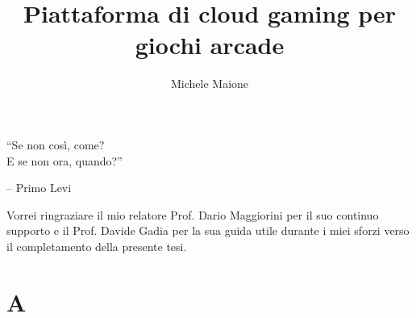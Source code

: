 \documentclass[italian]{report}
\title{Piattaforma di cloud gaming per giochi arcade}
\author{Michele Maione}
\begin{document}
\renewcommand\contentsname{Indice}
\frontespizio
\beforepreface

{
\raggedleft \large \sl 
	
	
	``Se non così, come?\\E se non ora, quando?''
	
	\bigskip
	
	\--- Primo Levi\\
}



Vorrei ringraziare il mio relatore Prof. Dario Maggiorini per il suo continuo supporto e il Prof. Davide Gadia per la sua guida utile durante i miei sforzi verso il completamento della presente tesi.

%
%
\afterpreface














% 
% 

\appendix

\chapter{A}

%
%


\end{document}
